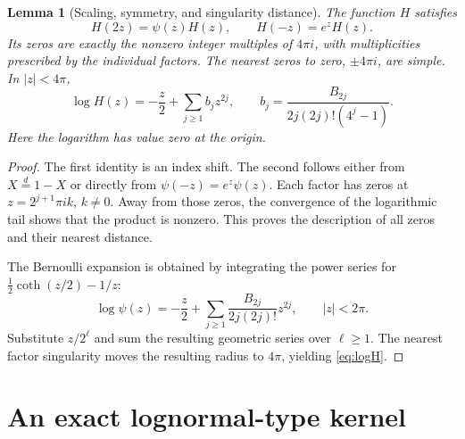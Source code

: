 \documentclass[11pt,letterpaper]{article}
\numberwithin{equation}{section}
\newtheorem{lemma}[theorem]{Lemma}
\theoremstyle{definition}
\theoremstyle{remark}
\begin{document}
\begin{lemma}[Scaling, symmetry, and singularity distance]\label{lem:H}
The function $H$ satisfies
\begin{equation}\label{eq:Hscale}
 H(2z)=\psi(z)H(z),\qquad H(-z)=e^zH(z).
\end{equation}
Its zeros are exactly the nonzero integer multiples of $4\pi i$, with
multiplicities prescribed by the individual factors. The nearest zeros to
zero, $\pm4\pi i$, are simple. In $|z|<4\pi$,
\begin{equation}\label{eq:logH}
 \log H(z)=-\frac z2+\sum_{j\ge1}b_jz^{2j},\qquad
 b_j=\frac{B_{2j}}{2j(2j)!(4^j-1)}.
\end{equation}
Here the logarithm has value zero at the origin.
\end{lemma}
\begin{proof}
The first identity is an index shift. The second follows either from
$X\overset d=1-X$ or directly from $\psi(-z)=e^z\psi(z)$.
Each factor has zeros at $z=2^{j+1}\pi i k$, $k\ne0$.
Away from those zeros, the convergence of the logarithmic tail shows that
the product is nonzero. This proves the description of all zeros and their
nearest distance.

The Bernoulli expansion is obtained by integrating the power series for
$\frac12\coth(z/2)-1/z$:
\[
 \log\psi(z)=-\frac z2+
 \sum_{j\ge1}\frac{B_{2j}}{2j(2j)!}z^{2j},\qquad |z|<2\pi.
\]
Substitute $z/2^\ell$ and sum the resulting geometric series over
$\ell\ge1$. The nearest factor singularity moves the resulting radius to
$4\pi$, yielding \eqref{eq:logH}.
\end{proof}

\section{An exact lognormal-type kernel}\label{sec:kernel}
\end{document}
